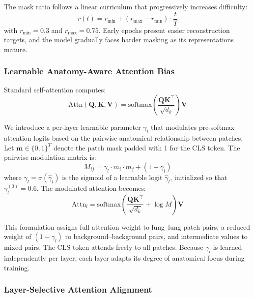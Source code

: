 The mask ratio follows a linear curriculum that progressively increases difficulty:
\begin{equation}
r(t) = r_{\min} + (r_{\max} - r_{\min}) \cdot \frac{t}{T}
\label{eq:curriculum}
\end{equation}
with $r_{\min} = 0.3$ and $r_{\max} = 0.75$. Early epochs present easier reconstruction targets, and the model gradually faces harder masking as its representations mature.

\subsubsection{Learnable Anatomy-Aware Attention Bias}
\label{sec:anatomy_attn}

Standard self-attention computes:
\begin{equation}
\text{Attn}(\bm{Q}, \bm{K}, \bm{V}) = \text{softmax}\!\left(\frac{\bm{Q}\bm{K}^\top}{\sqrt{d_k}}\right) \bm{V}
\end{equation}

We introduce a per-layer learnable parameter $\gamma_l$ that modulates pre-softmax attention logits based on the pairwise anatomical relationship between patches. Let $\bm{m} \in \{0,1\}^{T}$ denote the patch mask padded with 1 for the CLS token. The pairwise modulation matrix is:
\begin{equation}
M_{ij} = \gamma_l \cdot m_i \cdot m_j + (1 - \gamma_l)
\label{eq:modulation}
\end{equation}
where $\gamma_l = \sigma(\hat{\gamma}_l)$ is the sigmoid of a learnable logit $\hat{\gamma}_l$, initialized so that $\gamma_l^{(0)} = 0.6$. The modulated attention becomes:
\begin{equation}
\text{Attn}_l = \text{softmax}\!\left(\frac{\bm{Q}\bm{K}^\top}{\sqrt{d_k}} + \log M\right) \bm{V}
\label{eq:modulated_attn}
\end{equation}

This formulation assigns full attention weight to lung--lung patch pairs, a reduced weight of $(1 - \gamma_l)$ to background--background pairs, and intermediate values to mixed pairs. The CLS token attends freely to all patches. Because $\gamma_l$ is learned independently per layer, each layer adapts its degree of anatomical focus during training.

\subsubsection{Layer-Selective Attention Alignment}
\label{sec:attn_alignment}

